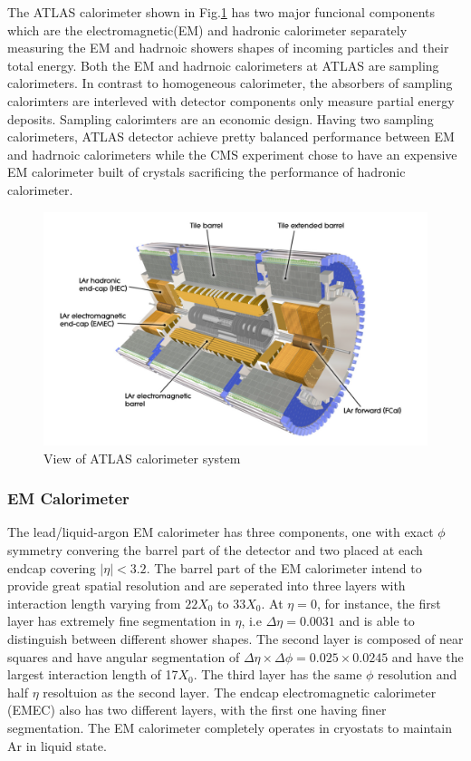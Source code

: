 \label{sec:detector-calo}

The ATLAS calorimeter shown in Fig.\ref{fig:detector-calo} has two major funcional components which are the electromagnetic(EM) and hadronic calorimeter separately measuring the EM and hadrnoic showers shapes of incoming particles and their total energy. Both the EM and hadrnoic calorimeters at ATLAS are sampling calorimeters. In contrast to homogeneous calorimeter, the absorbers of sampling calorimters are interleved with detector components only measure partial energy deposits. Sampling calorimters are an economic design. Having two sampling calorimeters, ATLAS detector achieve pretty balanced performance between EM and hadrnoic calorimeters while the CMS experiment chose to have an expensive EM calorimeter built of crystals sacrificing the performance of hadronic calorimeter. 


\begin{figure}[htpb!]
\begin{center}
  \includegraphics[width=0.9\linewidth]{figures/detector/calo}
\caption{View of ATLAS calorimeter system}
\label{fig:detector-calo}
\end{center}
\end{figure}


\subsubsection{EM Calorimeter}

The lead/liquid-argon EM calorimeter has three components, one with exact $\phi$ symmetry convering the barrel part of the detector and two placed at each endcap covering $|\eta|<3.2$. The barrel part of the EM calorimeter intend to provide great spatial resolution and are seperated into three layers with interaction length varying from $22X_0$ to $33X_0$. At $\eta =0$, for instance, the first layer has extremely fine segmentation in $\eta$, i.e $\Delta \eta = 0.0031$ and is able to distinguish between different shower shapes. The second layer is composed of near squares and have angular segmentation of $\Delta \eta \times \Delta \phi = 0.025 \times 0.0245$ and have the largest interaction length of 17$X_0$. The third layer has the same $\phi$ resolution and half $\eta$ resoltuion as the second layer. 
The endcap electromagnetic calorimeter (EMEC) also has two different layers, with the first one having finer segmentation. The EM calorimeter completely operates in cryostats to maintain Ar in liquid state.

